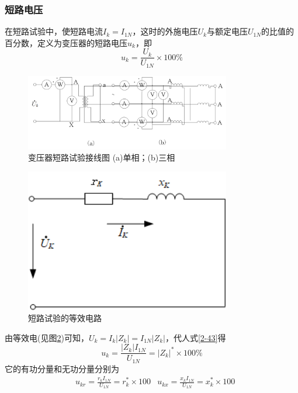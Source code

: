 \documentclass{book}
\begin{document}
\subsubsection{短路电压}
在短路试验中，使短路电流${{I}_{k}}={{I}_{1N}}$，这时的外施电压${{U}_{k}}$与额定电压${{U}_{1N}}$的比值的百分数，定义为变压器的短路电压${{u}_{k}}$，即
\begin{equation}
{{u}_{k}}=\frac{{{U}_{k}}}{{{U}_{1N}}}\times 100\%
\label{2-43}
\end{equation}
\begin{figure}[H]
	\centering
	\includegraphics[width=0.80\textwidth]{3-17g.png}
	\caption{变压器短路试验接线图
		(a)单相；(b)三相}
	\label{fig_3.17}
\end{figure}
\begin{figure}[H]
	\centering
	\includegraphics[width=0.80\textwidth]{3-18g.png}
	\caption{短路试验的等效电路}
	\label{fig_3.18}
\end{figure}
由等效电(见图\ref{fig_3.18})可知，${{U}_{k}}={{I}_{k}}\left| {{Z}_{k}} \right|={{I}_{1N}}\left| {{Z}_{k}} \right|$，代人式\eqref{2-43}得
\begin{equation}
{{u}_{k}}=\frac{\left| {{Z}_{k}} \right|{{I}_{1N}}}{{{U}_{1N}}}={{\left| {{Z}_{k}} \right|}^{*}}\times 100\%
\label{2-44}
\end{equation}
它的有功分量和无功分量分别为
\begin{equation}
\begin{aligned}
& {{u}_{kr}}=\frac{{{r}_{k}}{{I}_{1N}}}{{{U}_{1N}}}=r_{k}^{*}\times 100%
& {{u}_{kx}}=\frac{{{x}_{k}}{{I}_{1N}}}{{{U}_{1N}}}=x_{k}^{*}\times 100%
\end{aligned} 
\label{2-45}
\end{equation}
\end{document}

